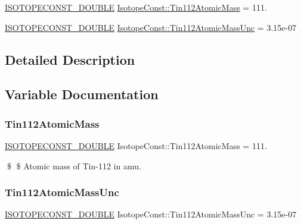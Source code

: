 \begin{DoxyCompactItemize}
\item 
\mbox{\hyperlink{group___isotope_const-_macros_ga8f45a7272ce02c0b4c65c44636ed719a}{I\+S\+O\+T\+O\+P\+E\+C\+O\+N\+S\+T\+\_\+\+D\+O\+U\+B\+LE}} \mbox{\hyperlink{group___isotope_const-_tin-_sn112_ga868eba9daf1bb0c50cd4ec9c04656527}{Isotope\+Const\+::\+Tin112\+Atomic\+Mass}} = 111.
\item 
\mbox{\hyperlink{group___isotope_const-_macros_ga8f45a7272ce02c0b4c65c44636ed719a}{I\+S\+O\+T\+O\+P\+E\+C\+O\+N\+S\+T\+\_\+\+D\+O\+U\+B\+LE}} \mbox{\hyperlink{group___isotope_const-_tin-_sn112_ga541b95810173ada2276e058f51d3a43d}{Isotope\+Const\+::\+Tin112\+Atomic\+Mass\+Unc}} = 3.\+15e-\/07
\end{DoxyCompactItemize}


\subsection{Detailed Description}


\subsection{Variable Documentation}
\mbox{\label{group___isotope_const-_tin-_sn112_ga868eba9daf1bb0c50cd4ec9c04656527}} 
\subsubsection{\texorpdfstring{Tin112\+Atomic\+Mass}{Tin112AtomicMass}}
{\footnotesize\ttfamily \mbox{\hyperlink{group___isotope_const-_macros_ga8f45a7272ce02c0b4c65c44636ed719a}{I\+S\+O\+T\+O\+P\+E\+C\+O\+N\+S\+T\+\_\+\+D\+O\+U\+B\+LE}} Isotope\+Const\+::\+Tin112\+Atomic\+Mass = 111.}

\$ \$ Atomic mass of Tin-\/112 in amu. \mbox{\label{group___isotope_const-_tin-_sn112_ga541b95810173ada2276e058f51d3a43d}} 
\subsubsection{\texorpdfstring{Tin112\+Atomic\+Mass\+Unc}{Tin112AtomicMassUnc}}
{\footnotesize\ttfamily \mbox{\hyperlink{group___isotope_const-_macros_ga8f45a7272ce02c0b4c65c44636ed719a}{I\+S\+O\+T\+O\+P\+E\+C\+O\+N\+S\+T\+\_\+\+D\+O\+U\+B\+LE}} Isotope\+Const\+::\+Tin112\+Atomic\+Mass\+Unc = 3.\+15e-\/07}


